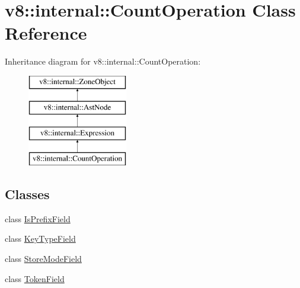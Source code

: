 \hypertarget{classv8_1_1internal_1_1_count_operation}{}\section{v8\+:\+:internal\+:\+:Count\+Operation Class Reference}
\label{classv8_1_1internal_1_1_count_operation}
Inheritance diagram for v8\+:\+:internal\+:\+:Count\+Operation\+:\begin{figure}[H]
\begin{center}
\leavevmode
\includegraphics[height=4.000000cm]{classv8_1_1internal_1_1_count_operation}
\end{center}
\end{figure}
\subsection*{Classes}
\begin{DoxyCompactItemize}
\item 
class \hyperlink{classv8_1_1internal_1_1_count_operation_1_1_is_prefix_field}{Is\+Prefix\+Field}
\item 
class \hyperlink{classv8_1_1internal_1_1_count_operation_1_1_key_type_field}{Key\+Type\+Field}
\item 
class \hyperlink{classv8_1_1internal_1_1_count_operation_1_1_store_mode_field}{Store\+Mode\+Field}
\item 
class \hyperlink{classv8_1_1internal_1_1_count_operation_1_1_token_field}{Token\+Field}
\end{DoxyCompactItemize}
